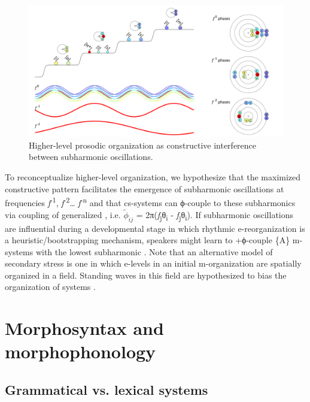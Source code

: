   
\begin{figure}
\includegraphics[width=\textwidth]{figures/Tilsen-img64.png}
\caption{Higher-level prosodic organization as constructive interference between subharmonic oscillations.}
\label{fig:4:14}
\end{figure}
 

  To reconceptualize higher-level  organization, we hypothesize that the maximized constructive  pattern facilitates the emergence of subharmonic oscillations at frequencies \textit{f}\textsuperscript{{}-1}, \textit{f}\textsuperscript{{}-2}… \textit{f}\textsuperscript{{}-n} and that cs-systems can ϕ-couple to these subharmonics via coupling of generalized , i.e. $\tilde{\phi}_{ij}$ = 2π(\textit{f}\textsubscript{j}θ\textsubscript{i} - \textit{f}\textsubscript{j}θ\textsubscript{i}). If subharmonic oscillations are influential during a developmental stage in which rhythmic e-reorganization is a heuristic/bootstrapping mechanism, speakers might learn to +ϕ-couple \{A\} m-systems with the lowest subharmonic . Note that an alternative model of secondary stress is one in which e-levels in an initial m-organization are spatially organized in a field. Standing waves in this field are hypothesized to bias the organization of  systems \citep{Tilsen2018b}.

\section{Morphosyntax and morphophonology}
\rohead{\headmark}
\subsection{Grammatical vs. lexical systems}

